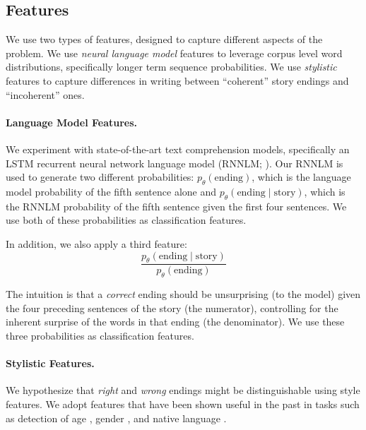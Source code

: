 \documentclass[11pt]{article}
\begin{document}
\subsection{Features}
We use two types of features, designed to capture different aspects of the problem. 
We use \textit{neural language model} features to leverage corpus level word distributions, specifically longer term sequence probabilities.
We use \textit{stylistic} features to capture differences in writing between ``coherent'' story endings and ``incoherent'' ones. 


\paragraph{Language Model Features.}
We experiment with state-of-the-art text comprehension models, specifically an LSTM \cite{hochreiter1997long} recurrent neural network language model (RNNLM; ).
Our RNNLM is used to generate two different probabilities:
$p_\theta(\textrm{ending})$, which is the language model probability of the fifth sentence alone and $p_\theta(\textrm{ending} \mid \textrm{story})$, which is the RNNLM probability of the fifth sentence given the first four sentences.  
We use both of these probabilities as classification features.

In addition, we also apply a third feature:
\begin{equation}
\frac{p_\theta(\textrm{ending} \mid
  \textrm{story})}{p_\theta(\textrm{ending})} \label{eq:ratio}
\end{equation}

The intuition is that a \emph{correct} ending should be unsurprising (to the model) given the four preceding sentences of the story (the numerator), controlling for the inherent surprise of the words in that ending (the denominator). 
We use these three probabilities as classification features.

\paragraph{Stylistic Features.}
We hypothesize that {\it right} and {\it wrong} endings might be distinguishable using style features.
We adopt features that have been shown useful in the past in tasks such as detection of age \cite{Schler:2006,Rosenthal:2011,nguyen:2011:latech}, gender  \cite{Argamon:2003,Schler:2006,bamman2014gender}, and native language
\cite{Koppel:2005,Tsur:2007,Bergsma:2012}.
\end{document}
